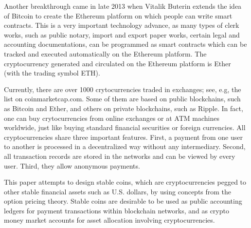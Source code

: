 \documentclass[11pt]{article}%
\numberwithin{equation}{section}
\theoremstyle{plain}
\begin{document}
Another breakthrough came in late 2013 when Vitalik Buterin extends the idea of Bitcoin to create the Ethereum platform on which people can write smart contracts. This is a very important technology advance, as many types of clerk works, such as public notary, import and export paper works, certain legal and accounting documentations, can be
programmed as smart contracts which can be tracked and executed automatically on the Ethereum platform. The cryptocurrency generated and circulated on the Ethereum platform is Ether (with the trading symbol ETH).

Currently, there are over 1000 crytocurrencies traded in exchanges; see, e.g, the list on coinmarketcap.com. Some of them are based on public blockchains, such as Bitcoin and Ether, and others on private blockchains, such as Ripple. In fact, one can buy crytocurrencies from online exchanges or at ATM machines worldwide, just like buying standard financial securities or foreign currencies.  All cryptocurrencies share three important features. First, a payment from one user to another is processed in a decentralized way without any intermediary. Second, all transaction records are stored in the networks and can be viewed by every user. Third, they allow anonymous payments.




This paper attempts to design stable coins, which are cryptocurrencies pegged to other stable financial assets such as U.S. dollars, by using concepts from the option pricing theory.  Stable coins are desirable to be used as public accounting ledgers for payment transactions within  blockchain networks, and as crypto money market accounts for asset allocation involving cryptocurrencies.
\end{document}
